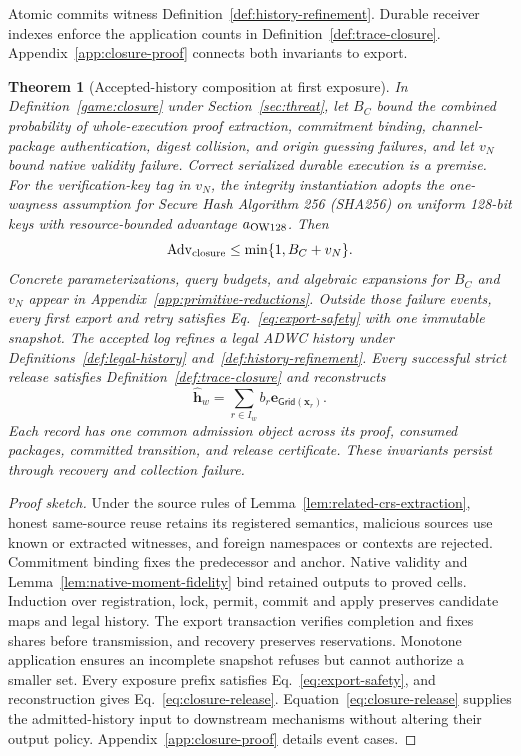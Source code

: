 \documentclass[conference,compsoc]{IEEEtran}
\theoremstyle{definition}
\numberwithin{equation}{section}
\numberwithin{table}{section}
\numberwithin{figure}{section}
\theoremstyle{plain}
\newtheorem{theorem}{Theorem}[section]
\newtheorem{theorem}{Theorem}
\begin{document}
\label{lem:main-boundary-composition}
Atomic commits witness Definition~\ref{def:history-refinement}.
Durable receiver indexes enforce the application counts in
Definition~\ref{def:trace-closure}. Appendix~\ref{app:closure-proof}
connects both invariants to export.

\begin{theorem}[Accepted-history composition at first exposure]
\label{thm:main-semantic-closure}
In Definition~\ref{game:closure} under Section~\ref{sec:threat}, let \(B_C\) bound
the combined probability of whole-execution proof extraction, commitment binding,
channel-package authentication, digest collision, and origin guessing failures,
and let \(v_N\) bound native validity failure. Correct serialized durable execution
is a premise. For the verification-key tag in \(v_N\), the integrity instantiation
adopts the one-wayness assumption for Secure Hash Algorithm 256 (SHA256) on uniform 128-bit keys with resource-bounded
advantage \(a_{\rm OW128}\). Then
\begin{equation}
 \operatorname{Adv}_{\rm closure}\le\min\{1,B_C+v_N\}.
 \label{eq:primitive-bounds}
\end{equation}
Concrete parameterizations, query budgets, and algebraic expansions for \(B_C\)
and \(v_N\) appear in Appendix~\ref{app:primitive-reductions}.
Outside those failure events, every first export and retry satisfies
Eq.~\eqref{eq:export-safety} with one immutable snapshot.
The accepted log refines a legal ADWC history under Definitions~\ref{def:legal-history}
and~\ref{def:history-refinement}. Every successful strict release satisfies
Definition~\ref{def:trace-closure} and reconstructs
\begin{equation}
 \hat{\mathbf h}_w=\sum_{r\in I_w}b_r\mathbf e_{\mathsf{Grid}(\mathbf x_r)}.
 \label{eq:closure-release}
\end{equation}
Each record has one common admission object across its proof, consumed
packages, committed transition, and release certificate. These invariants
persist through recovery and collection failure.
\end{theorem}
\begin{proof}[Proof sketch]
Under the source rules of Lemma~\ref{lem:related-crs-extraction}, honest
same-source reuse retains its registered semantics, malicious sources use known
or extracted witnesses, and foreign namespaces or contexts are rejected.
Commitment binding fixes the predecessor and anchor. Native validity and Lemma~\ref{lem:native-moment-fidelity}
bind retained outputs to proved cells. Induction over registration, lock, permit, commit and apply preserves candidate maps and legal history. The export transaction verifies completion and fixes shares before transmission, and recovery preserves reservations. Monotone application ensures an incomplete snapshot refuses but cannot authorize a smaller set. Every exposure prefix satisfies Eq.~\eqref{eq:export-safety}, and reconstruction gives Eq.~\eqref{eq:closure-release}. Equation~\eqref{eq:closure-release} supplies the admitted-history input to downstream mechanisms without altering their output policy. Appendix~\ref{app:closure-proof} details event cases.
\end{proof}
\end{document}

